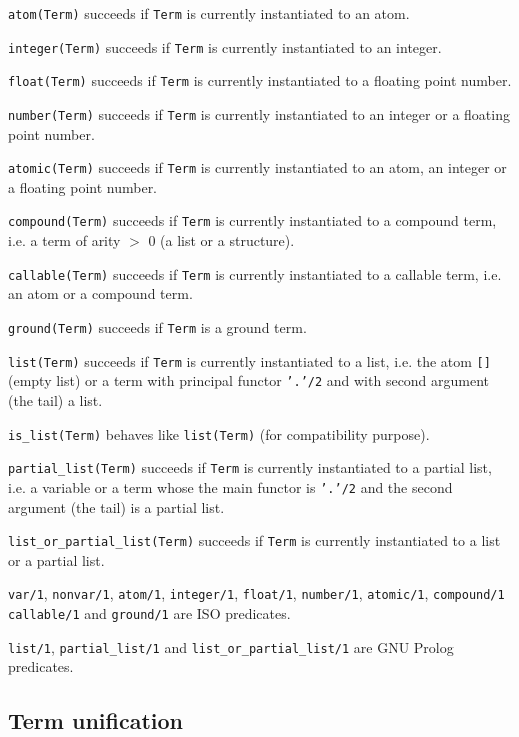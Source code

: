 \texttt{atom(Term)} succeeds if \texttt{Term} is currently instantiated
to an atom.

\texttt{integer(Term)} succeeds if \texttt{Term} is currently
instantiated to an integer.

\texttt{float(Term)} succeeds if \texttt{Term} is currently instantiated
to a floating point number.

\texttt{number(Term)} succeeds if \texttt{Term} is currently instantiated
to an integer or a floating point number.

\texttt{atomic(Term)} succeeds if \texttt{Term} is currently instantiated
to an atom, an integer or a floating point number.

\texttt{compound(Term)} succeeds if \texttt{Term} is currently
instantiated to a compound term, i.e. a term of arity $>$ 0 (a list or a
structure).

\texttt{callable(Term)} succeeds if \texttt{Term} is currently
instantiated to a callable term, i.e. an atom or a compound term.

\texttt{ground(Term)} succeeds if \texttt{Term} is a ground term.

\texttt{list(Term)} succeeds if \texttt{Term} is currently instantiated
to a list, i.e. the atom \texttt{[]} (empty list) or a term with principal
functor \texttt{'.'/2} and with second argument (the tail) a list.

\texttt{is\_list(Term)} behaves like \texttt{list(Term)} (for compatibility
purpose).

\texttt{partial\_list(Term)} succeeds if \texttt{Term} is currently
instantiated to a partial list, i.e. a variable or a term whose the main
functor is \texttt{'.'/2} and the second argument (the tail) is a partial
list.

\texttt{list\_or\_partial\_list(Term)} succeeds if \texttt{Term} is
currently instantiated to a list or a partial list.

\PlErrorsNone

\Portability

\texttt{var/1}, \texttt{nonvar/1}, \texttt{atom/1}, \texttt{integer/1},
\texttt{float/1}, \texttt{number/1}, \texttt{atomic/1}, \texttt{compound/1}
\texttt{callable/1} and \texttt{ground/1} are ISO predicates.

\texttt{list/1}, \texttt{partial\_list/1} and
\texttt{list\_or\_partial\_list/1} are GNU Prolog predicates.

\subsection{Term unification}

